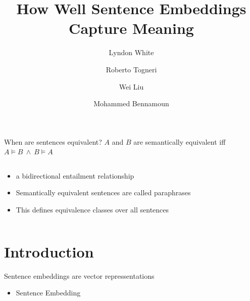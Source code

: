 \documentclass[12pt,landscape,english]{beamer}
\begin{document}

\title[White et al.]{How Well Sentence Embeddings Capture Meaning}
\author[White et al.]{Lyndon White \and Roberto Togneri \and Wei Liu \and Mohammed Bennamoun}
\date{}

\begin{frame}[plain]
	\titlepage
\end{frame}



\begin{frame}{When are sentences equivalent?}
	$A$ and $B$ are semantically equivalent iff $A\models B\:\wedge\:B\models A$
	\begin{columns}
		\begin{column}{0.5\textwidth}
			\begin{itemize}
				
				\item<1-> a bidirectional entailment relationship
				\item<2> Semantically equivalent sentences are called \alert{paraphrases}
				\item<3> This defines equivalence classes over all sentences
			\end{itemize}
		\end{column}
		\begin{column}{0.5\textwidth}
			
		\end{column}
	\end{columns}
\end{frame}



\section{Introduction}
\begingroup %
\begin{frame}{Sentence embeddings are vector repressentations}
	\begin{itemize}
		\item Sentence Embedding
	\end{itemize}
\end{frame}
\endgroup
\end{document}
